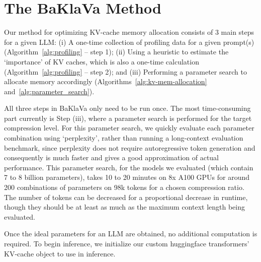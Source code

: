\section{The BaKlaVa Method}\label{sec:methods}
Our method for optimizing KV-cache memory allocation consists of 3 main steps for a given LLM: (i) A one-time collection of profiling data for a given prompt(s) (Algorithm~\ref{alg:profiling} -- step 1);  (ii) Using a heuristic to estimate the `importance' of KV caches,  which is also a one-time calculation  (Algorithm~\ref{alg:profiling} -- step 2); and (iii) Performing a parameter search to allocate memory accordingly (Algorithms~\ref{alg:kv-mem-allocation} and~\ref{alg:parameter_search}). 

All three steps in BaKlaVa only need to be run once. The most time-consuming part currently is Step (iii), where a parameter search is performed for the target compression level. For this parameter search, we quickly evaluate each parameter combination using `perplexity', rather than running a long-context evaluation benchmark, since perplexity does not require autoregressive token generation and consequently is much faster and gives a good approximation of actual performance. This parameter search, for the models we evaluated (which contain 7 to 8 billion parameters), takes 10 to 20 minutes on 8x A100 GPUs for around 200 combinations of parameters on 98k tokens for a chosen compression ratio. The number of tokens can be decreased for a proportional decrease in runtime, though they should be at least as much as the maximum context length being evaluated.

Once the ideal parameters for an LLM are obtained, no additional computation is required.  To begin inference, we initialize our custom huggingface transformers' KV-cache object to use in inference.   




